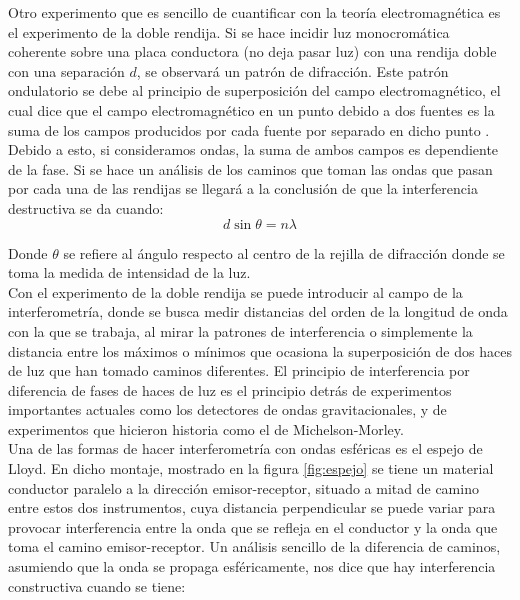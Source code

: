 \documentclass[%
 reprint,
 amsmath,amssymb,
 aps,
]{revtex4-1}
\begin{document}
Otro experimento que es sencillo de cuantificar con la teoría electromagnética es el experimento de la doble rendija. Si se hace incidir luz monocromática coherente sobre una placa conductora (no deja pasar luz) con una rendija doble con una separación $d$, se observará un patrón de difracción. Este patrón ondulatorio se debe al principio de superposición del campo electromagnético, el cual dice que el campo electromagnético en un punto debido a dos fuentes es la suma de los campos producidos por cada fuente por separado en dicho punto \cite{Griffiths}. Debido a esto, si consideramos ondas, la suma de ambos campos es dependiente de la fase. Si se hace un análisis de los caminos que toman las ondas que pasan por cada una de las rendijas se llegará a la conclusión de que la interferencia destructiva se da cuando:\\


\begin{equation}
d\sin{\theta} = n\lambda
\label{eq:interferencia}
\end{equation}

Donde $\theta$ se refiere al ángulo respecto al centro de la rejilla de difracción donde se toma la medida de intensidad de la luz.\\

Con el experimento de la doble rendija se puede introducir al campo de la interferometría, donde se busca medir distancias del orden de la longitud de onda con la que se trabaja, al mirar la patrones de interferencia o simplemente la distancia entre los máximos o mínimos que ocasiona la superposición de dos haces de luz que han tomado caminos diferentes. El principio de interferencia por diferencia de fases de haces de luz es el principio detrás de experimentos importantes actuales como los detectores de ondas gravitacionales, y de experimentos que hicieron historia como el de Michelson-Morley.\\

Una de las formas de hacer interferometría con ondas esféricas es el espejo de Lloyd. En dicho montaje, mostrado en la figura \ref{fig:espejo} se tiene un material conductor paralelo a la dirección emisor-receptor, situado a mitad de camino entre estos dos instrumentos, cuya distancia perpendicular se puede variar para provocar interferencia entre la onda que se refleja en el conductor y la onda que toma el camino emisor-receptor. Un análisis sencillo de la diferencia de caminos, asumiendo que la onda se propaga esféricamente, nos dice que hay interferencia constructiva cuando se tiene:\\
\end{document}
